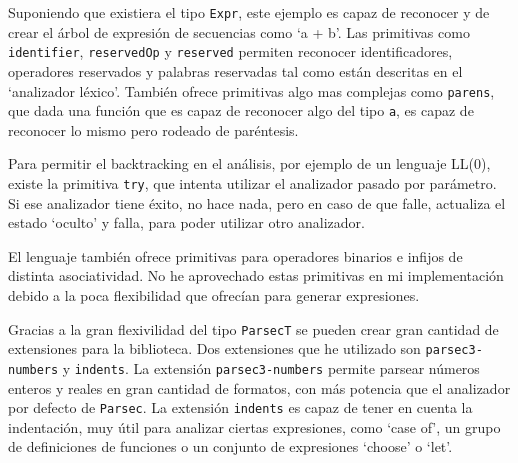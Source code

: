 \documentclass[class=article, crop=false]{standalone}
\begin{document}
Suponiendo que existiera el tipo \verb`Expr`, este ejemplo es capaz de reconocer y de crear
el árbol de expresión de secuencias como `a + b'. Las primitivas como \verb`identifier`,
\verb`reservedOp` y \verb`reserved` permiten reconocer identificadores, operadores reservados
y palabras reservadas tal como están descritas en el `analizador léxico'. También ofrece
primitivas algo mas complejas como \verb`parens`, que dada una función que es capaz de
reconocer algo del tipo \verb`a`, es capaz de reconocer lo mismo pero rodeado de paréntesis.

Para permitir el backtracking en el análisis, por ejemplo de un lenguaje LL(0), existe la
primitiva \verb`try`, que intenta utilizar el analizador pasado por parámetro. Si ese
analizador tiene éxito, no hace nada, pero en caso de que falle, actualiza el estado `oculto'
y falla, para poder utilizar otro analizador.

El lenguaje también ofrece primitivas para operadores binarios e infijos de distinta
asociatividad. No he aprovechado estas primitivas en mi implementación debido a la poca
flexibilidad que ofrecían para generar expresiones.

Gracias a la gran flexivilidad del tipo \verb`ParsecT` se pueden crear gran cantidad de
extensiones para la biblioteca. Dos extensiones que he utilizado son \verb`parsec3-numbers` y
\verb`indents`. La extensión \verb`parsec3-numbers` permite parsear números enteros y reales
en gran cantidad de formatos, con más potencia que el analizador por defecto de
\verb`Parsec`. La extensión \verb`indents` es capaz de tener en cuenta la indentación, muy
útil para analizar ciertas expresiones, como `case of', un grupo de definiciones de funciones
o un conjunto de expresiones `choose' o `let'.
\end{document}
